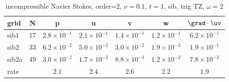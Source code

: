 \begin{table}[hbt]
\begin{center}
\begin{tabular}{|l|c|c|c|c|c|c|} \hline\hline 
grid  & N &  p &  u & v & w & $\grad\cdot\uv$\\ \hline 
                sib1 &    17 &  $2.8\times10^{ -1}$  &  $2.1\times10^{ -1}$  &  $1.4\times10^{ -1}$  &  $1.2\times10^{ -1}$  &  $6.2\times10^{ -1}$   \\ \hline
                sib2 &    33 &  $6.2\times10^{ -2}$  &  $5.0\times10^{ -2}$  &  $3.0\times10^{ -2}$  &  $1.9\times10^{ -2}$  &  $1.9\times10^{ -1}$   \\ \hline
               sib2a &    49 &  $3.0\times10^{ -2}$  &  $1.7\times10^{ -2}$  &  $8.8\times10^{ -3}$  &  $1.2\times10^{ -2}$  &  $7.8\times10^{ -2}$   \\ \hline
    rate            &     &       $2.1$ &       $2.4$ &       $2.6$ &       $2.2$ &       $1.9$  \\ \hline\hline
\end{tabular}
\caption{incompressible Navier Stokes, order=$2$, $\nu=0.1$, $t=1$, sib, trig TZ, $\omega=2$}\label{table:ins.sib}
\end{center}
\end{table}

